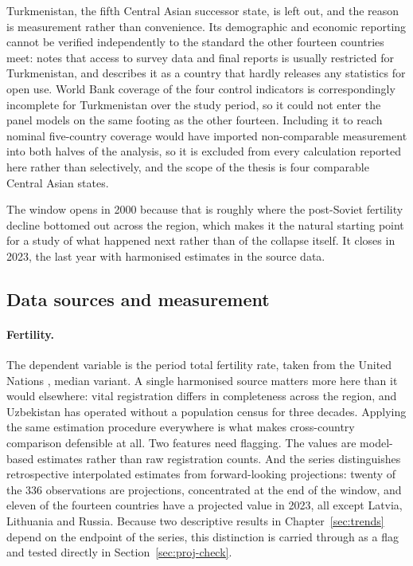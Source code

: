 Turkmenistan, the fifth Central Asian successor state, is left out, and the reason is measurement rather than convenience. Its demographic and economic reporting cannot be verified independently to the standard the other fourteen countries meet: \textcite{spoorenberg2015} notes that access to survey data and final reports is usually restricted for Turkmenistan, and \textcite{nedoluzhko2012} describes it as a country that hardly releases any statistics for open use. World Bank coverage of the four control indicators is correspondingly incomplete for Turkmenistan over the study period, so it could not enter the panel models on the same footing as the other fourteen. Including it to reach nominal five-country coverage would have imported non-comparable measurement into both halves of the analysis, so it is excluded from every calculation reported here rather than selectively, and the scope of the thesis is four comparable Central Asian states.

The window opens in 2000 because that is roughly where the post-Soviet fertility decline bottomed out across the region, which makes it the natural starting point for a study of what happened next rather than of the collapse itself. It closes in 2023, the last year with harmonised estimates in the source data.

\subsection{Data sources and measurement}
\label{sec:data}

\paragraph{Fertility.} The dependent variable is the period total fertility rate, taken from the United Nations \textcite{wpp2024}, median variant. A single harmonised source matters more here than it would elsewhere: vital registration differs in completeness across the region, and Uzbekistan has operated without a population census for three decades. Applying the same estimation procedure everywhere is what makes cross-country comparison defensible at all. Two features need flagging. The values are model-based estimates rather than raw registration counts. And the series distinguishes retrospective interpolated estimates from forward-looking projections: twenty of the 336 observations are projections, concentrated at the end of the window, and eleven of the fourteen countries have a projected value in 2023, all except Latvia, Lithuania and Russia. Because two descriptive results in Chapter~\ref{sec:trends} depend on the endpoint of the series, this distinction is carried through as a flag and tested directly in Section~\ref{sec:proj-check}.

